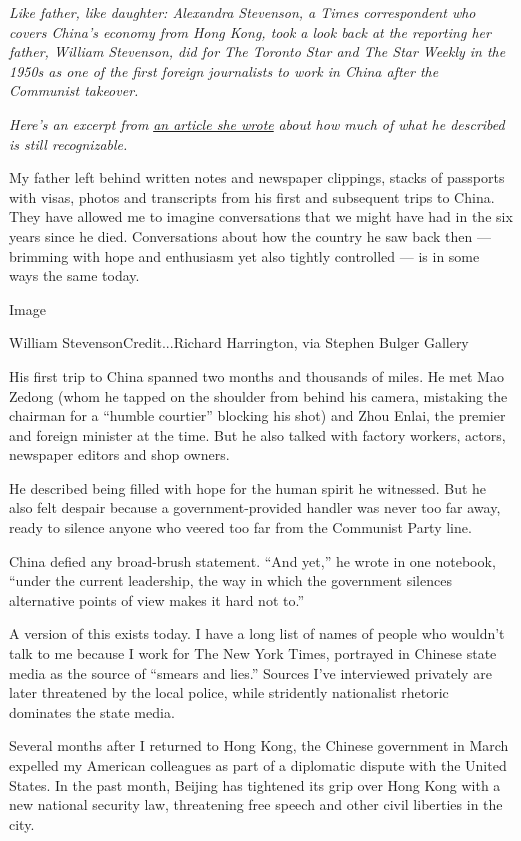 \emph{Like father, like daughter: Alexandra Stevenson, a Times
correspondent who covers China's economy from Hong Kong, took a look
back at the reporting her father, William Stevenson, did for The Toronto
Star and The Star Weekly in the 1950s as one of the first foreign
journalists to work in China after the Communist takeover.}

\emph{Here's an excerpt from}
\href{https://www.nytimes3xbfgragh.onion/interactive/2020/07/30/world/asia/china-1950s-echoed-today.html}{\emph{an
article she wrote}} \emph{about how much of what he described is still
recognizable.}

My father left behind written notes and newspaper clippings, stacks of
passports with visas, photos and transcripts from his first and
subsequent trips to China. They have allowed me to imagine conversations
that we might have had in the six years since he died. Conversations
about how the country he saw back then --- brimming with hope and
enthusiasm yet also tightly controlled --- is in some ways the same
today.

Image

William StevensonCredit...Richard Harrington, via Stephen Bulger Gallery

His first trip to China spanned two months and thousands of miles. He
met Mao Zedong (whom he tapped on the shoulder from behind his camera,
mistaking the chairman for a ``humble courtier'' blocking his shot) and
Zhou Enlai, the premier and foreign minister at the time. But he also
talked with factory workers, actors, newspaper editors and shop owners.

He described being filled with hope for the human spirit he witnessed.
But he also felt despair because a government-provided handler was never
too far away, ready to silence anyone who veered too far from the
Communist Party line.

China defied any broad-brush statement. ``And yet,'' he wrote in one
notebook, ``under the current leadership, the way in which the
government silences alternative points of view makes it hard not to.''

A version of this exists today. I have a long list of names of people
who wouldn't talk to me because I work for The New York Times, portrayed
in Chinese state media as the source of ``smears and lies.'' Sources
I've interviewed privately are later threatened by the local police,
while stridently nationalist rhetoric dominates the state media.

Several months after I returned to Hong Kong, the Chinese government in
March expelled my American colleagues as part of a diplomatic dispute
with the United States. In the past month, Beijing has tightened its
grip over Hong Kong with a new national security law, threatening free
speech and other civil liberties in the city.

